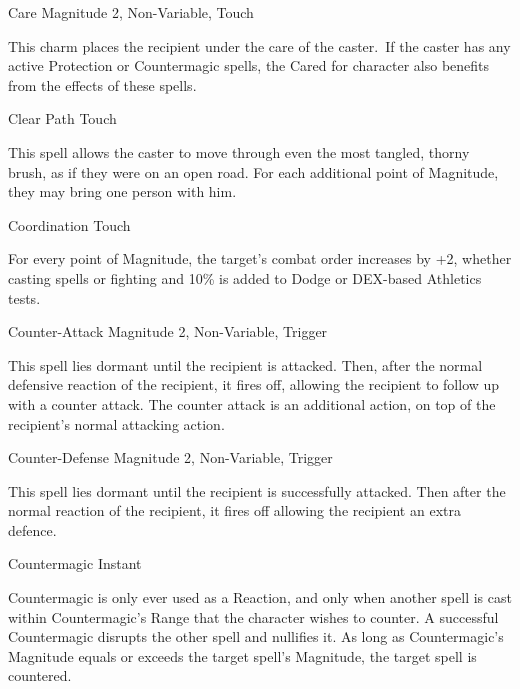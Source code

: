  
\begin{rpg-spell}
{Care}
{Magnitude 2, Non-Variable, Touch}

This charm places the recipient under the care of the caster. If the caster has any active Protection or Countermagic spells, the Cared for character also benefits from the effects of these spells.
\end{rpg-spell}

\begin{rpg-spell}
{Clear Path}
{Touch}

This spell allows the caster to move through even the most tangled, thorny brush, as if they were on an open road. For each additional point of Magnitude, they may bring one person with him. 
\end{rpg-spell}


\begin{rpg-spell}
{Coordination}
{Touch}

For every point of Magnitude, the target’s combat order increases by +2, whether casting spells or fighting and 10\% is added to Dodge or DEX-based Athletics tests. 
\end{rpg-spell}


\begin{rpg-spell}
{Counter-Attack}
{Magnitude 2, Non-Variable, Trigger}

This spell lies dormant until the recipient is attacked. Then, after the normal defensive reaction of the recipient, it fires off, allowing the recipient to follow up with a counter attack. The counter attack is an additional action, on top of the recipient’s normal attacking action.
\end{rpg-spell}


\begin{rpg-spell}
{Counter-Defense}
{Magnitude 2, Non-Variable, Trigger}

This spell lies dormant until the recipient is successfully attacked. Then after the normal reaction of the recipient, it fires off allowing the recipient an extra defence.
\end{rpg-spell}



\begin{rpg-spell}
{Countermagic}
{Instant}

Countermagic is only ever used as a Reaction, and only when another spell is cast within Countermagic’s Range that the character wishes to counter. A successful Countermagic disrupts the other spell and nullifies it. As long as Countermagic’s Magnitude equals or exceeds the target spell’s Magnitude, the target spell is countered.
\end{rpg-spell}


